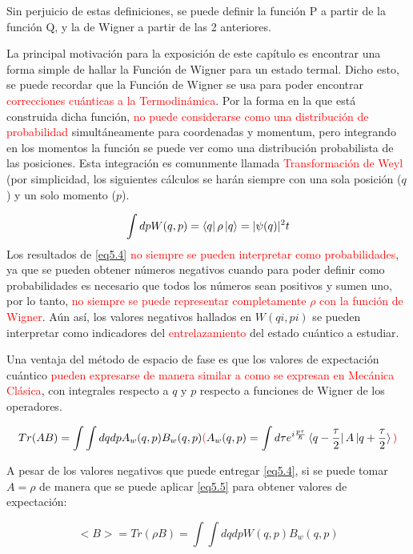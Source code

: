 \documentclass{book}
\begin{document}
Sin perjuicio de estas definiciones, se puede definir la función P a partir de la función Q, y la de Wigner a partir de las 2 anteriores.

La principal motivación para la exposición de este capítulo es encontrar una forma simple de hallar la Función de Wigner para un estado termal. Dicho esto, se puede recordar que la Función de Wigner se usa para poder encontrar \textcolor{red}{correcciones cuánticas a la Termodinámica}. Por la forma en la que está construida dicha función, \textcolor{red}{no puede considerarse como una distribución de probabilidad} simultáneamente para coordenadas y momentum, pero integrando en los momentos la función se puede ver como una distribución probabilista de las posiciones. Esta integración es comunmente llamada \textcolor{red}{Transformación de Weyl} (por simplicidad, los siguientes cálculos se harán siempre con una sola posición ($q$) y un solo momento ($p$).

\begin{equation}\label{eq5.4} \int dp W(q,p)=\bra{q}\rho\ket{q}=\lvert \psi(q)\rvert^2 t\end{equation}
Los resultados de \ref{eq5.4} \textcolor{red}{no siempre se pueden interpretar como probabilidades}, ya que se pueden obtener números negativos cuando para poder definir como probabilidades es necesario que todos los números sean positivos y sumen uno, por lo tanto, \textcolor{red}{no siempre se puede representar completamente $\rho$ con la función de Wigner}. Aún así, los valores negativos hallados en $W(qi,pi)$ se pueden interpretar como indicadores del \textcolor{red}{entrelazamiento} del estado cuántico a estudiar.

Una ventaja del método de espacio de fase es que los valores de expectación cuántico \textcolor{red}{pueden expresarse de manera similar a como se expresan en Mecánica Clásica}, con integrales respecto a $q$ y $p$ respecto a funciones de Wigner de los operadores.

\begin{equation}\label{eq5.5}Tr(AB)=\int\int dq dp A_w(q,p)B_w(q,p)\textcolor{red}{(}A_w(q,p)=\int d\tau e^{i\frac{p\tau}{\hslash}}\bra{q-\frac{\tau}{2}}A\ket{q+\frac{\tau}{2}}\textcolor{red}{)}\end{equation}

A pesar de los valores negativos que puede entregar \ref{eq5.4}, si se puede tomar $A=\rho$ de manera que se puede aplicar \ref{eq5.5} para obtener valores de expectación:

\begin{equation}\label{eq5.6}<B>=Tr(\rho B)=\int\int dq dp W(q,p)B_w(q,p)\end{equation}
\end{document}
